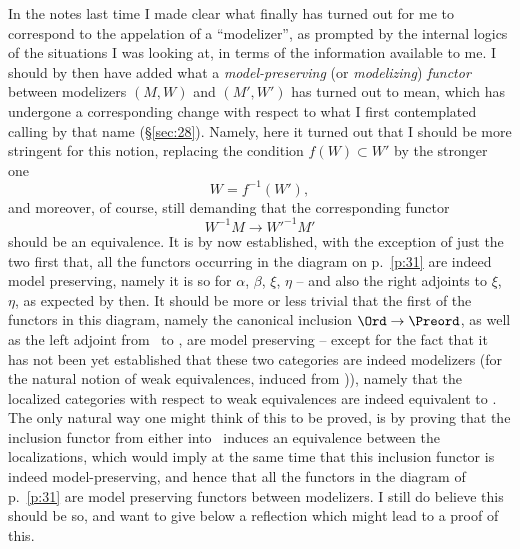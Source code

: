 \bigbreak

\presectionfill{}\par

\label{sec:42}%
In the notes last time I made clear what finally has turned out for me
to correspond to the appelation of a ``modelizer'', as prompted by the
internal logics of the situations I was looking at, in terms of the
information available to me. I should by then have added what a
\emph{model-preserving} (or \emph{modelizing}) \emph{functor} between
modelizers $(M,W)$ and $(M',W')$ has turned out to mean, which has
undergone a corresponding change with respect to what I first
contemplated calling by that name (\S \ref{sec:28}). Namely, here it
turned out that I should be more stringent for this notion, replacing
the condition $f(W)\subset W'$ by the stronger one
\[ W = f^{-1}(W'),\]
and moreover, of course, still demanding that the corresponding
functor
\[W^{-1}M \to W'^{-1}M'\]
should be an equivalence. It is by now established, with the exception
of just the two first that, all the functors occurring in the diagram
on p.~\ref{p:31} are indeed model preserving, namely it
is so for $\alpha$, $\beta$, $\xi$, $\eta$ -- and also the right
adjoints to $\xi$, $\eta$, as expected by then. It should be more or
less trivial that the first of the functors in this diagram, namely
the canonical inclusion $\Ord\to\Preord$, as well as the left adjoint
from \Preord\ to \Ord, are model preserving -- except for the fact
that it has not been yet established that these two categories are
indeed modelizers (for the natural notion of weak equivalences, induced
from \Cat)), namely that the localized categories with
respect to weak equivalences are indeed equivalent to \Hot. The only
natural way one might think of this to be proved, is by proving that
the inclusion functor from either into \Cat\ induces an equivalence
between the localizations, which would imply at the same time that
this inclusion functor is indeed model-preserving, and hence that all
the functors in the diagram of p.~\ref{p:31} are model
preserving functors between modelizers. I still do believe this should
be so, and want to give below a reflection which might lead to a proof
of this.

